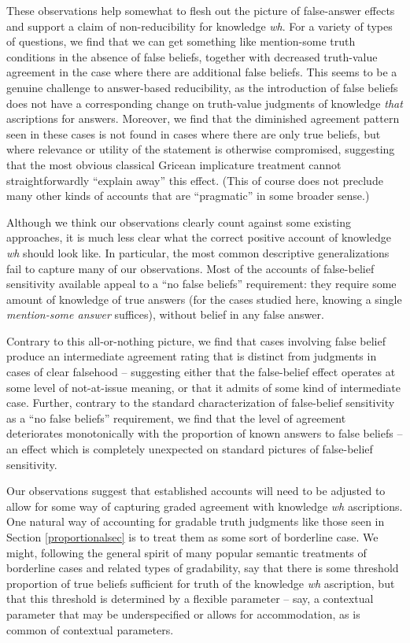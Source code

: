 \documentclass[a4paper]{article}
\begin{document}
These observations help somewhat to flesh out the picture of false-answer effects and support a claim of non-reducibility for knowledge \textit{wh}. For a variety of types of questions, we find that we can get something like mention-some truth conditions in the absence of false beliefs, together with decreased truth-value agreement in the case where there are additional false beliefs. This seems to be a genuine challenge to answer-based reducibility, as the introduction of false beliefs does not have a corresponding change on truth-value judgments of knowledge \textit{that} ascriptions for answers. Moreover, we find that the diminished agreement pattern seen in these cases is not found in cases where there are only true beliefs, but where relevance or utility of the statement is otherwise compromised, suggesting that the most obvious classical Gricean implicature treatment cannot straightforwardly ``explain away'' this effect. (This of course does not preclude many other kinds of accounts that are ``pragmatic'' in some broader sense.)

Although we think our observations clearly count against some existing approaches, it is much less clear what the correct positive account of knowledge \textit{wh} should look like. In particular, the most common descriptive generalizations fail to capture many of our observations. Most of the accounts of false-belief sensitivity available appeal to a ``no false beliefs'' requirement: they require some amount of knowledge of true answers (for the cases studied here, knowing a single \emph{mention-some answer} suffices), without belief in any false answer. 

Contrary to this all-or-nothing picture, we find that cases involving false belief produce an intermediate agreement rating that is distinct from judgments in cases of clear falsehood -- suggesting either that the false-belief effect operates at some level of not-at-issue meaning, or that it admits of some kind of intermediate case. Further, contrary to the standard characterization of false-belief sensitivity as a ``no false beliefs'' requirement, we find that	 the level of agreement deteriorates monotonically with the proportion of known answers to false beliefs -- an effect which is completely unexpected on standard pictures of false-belief sensitivity.

Our observations suggest that established accounts will need to be adjusted to allow for some way of capturing graded agreement with knowledge \textit{wh} ascriptions. One natural way of accounting for gradable truth judgments like those seen in Section \ref{proportionalsec} is to treat them as some sort of borderline case. We might, following the general spirit of many popular semantic treatments of borderline cases and related types of gradability, say that there is some threshold proportion of true beliefs sufficient for truth of the knowledge \textit{wh} ascription, but that this threshold is determined by a flexible parameter -- say, a contextual parameter that may be underspecified or allows for accommodation, as is common of contextual parameters.
\end{document}
